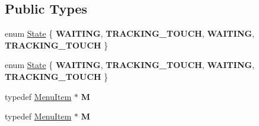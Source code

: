 \subsection*{Public Types}
\begin{DoxyCompactItemize}
\item 
enum \hyperlink{classMenu_a8269685e78203b028d5bd77c339898b2}{State} \{ {\bfseries W\+A\+I\+T\+I\+NG}, 
{\bfseries T\+R\+A\+C\+K\+I\+N\+G\+\_\+\+T\+O\+U\+CH}, 
{\bfseries W\+A\+I\+T\+I\+NG}, 
{\bfseries T\+R\+A\+C\+K\+I\+N\+G\+\_\+\+T\+O\+U\+CH}
 \}
\item 
enum \hyperlink{classMenu_a8269685e78203b028d5bd77c339898b2}{State} \{ {\bfseries W\+A\+I\+T\+I\+NG}, 
{\bfseries T\+R\+A\+C\+K\+I\+N\+G\+\_\+\+T\+O\+U\+CH}, 
{\bfseries W\+A\+I\+T\+I\+NG}, 
{\bfseries T\+R\+A\+C\+K\+I\+N\+G\+\_\+\+T\+O\+U\+CH}
 \}
\item 
\mbox{\label{classMenu_ab485291fa7c6197fed5abf188780bc22}} 
typedef \hyperlink{classMenuItem}{Menu\+Item} $\ast$ {\bfseries M}
\item 
\mbox{\label{classMenu_ab485291fa7c6197fed5abf188780bc22}} 
typedef \hyperlink{classMenuItem}{Menu\+Item} $\ast$ {\bfseries M}
\end{DoxyCompactItemize}

